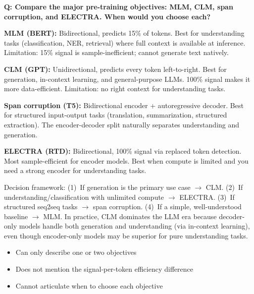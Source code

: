 \begin{interviewq}
\textbf{Q: Compare the major pre-training objectives: MLM, CLM, span corruption,
and ELECTRA. When would you choose each?}

 \quad {} \quad \badgefreq{\freqmed}

\stronganswer
\textbf{MLM (BERT):} Bidirectional, predicts 15\% of tokens.  Best for
understanding tasks (classification, NER, retrieval) where full context is
available at inference.  Limitation: 15\% signal is sample-inefficient; cannot
generate text natively.

\textbf{CLM (GPT):} Unidirectional, predicts every token left-to-right.  Best for
generation, in-context learning, and general-purpose LLMs.  100\% signal makes it
more data-efficient.  Limitation: no right context for understanding tasks.

\textbf{Span corruption (T5):} Bidirectional encoder + autoregressive decoder.  Best
for structured input-output tasks (translation, summarization, structured extraction).
The encoder-decoder split naturally separates understanding and generation.

\textbf{ELECTRA (RTD):} Bidirectional, 100\% signal via replaced token detection.
Most sample-efficient for encoder models.  Best when compute is limited and you
need a strong encoder for understanding tasks.

Decision framework: (1)~If generation is the primary use case $\rightarrow$ CLM.
(2)~If understanding/classification with unlimited compute $\rightarrow$ ELECTRA.
(3)~If structured seq2seq tasks $\rightarrow$ span corruption. (4)~If a simple,
well-understood baseline $\rightarrow$ MLM.  In practice, CLM dominates the LLM
era because decoder-only models handle both generation and understanding (via
in-context learning), even though encoder-only models may be superior for
pure understanding tasks.

\redflags
\begin{itemize}
    \item Can only describe one or two objectives
    \item Does not mention the signal-per-token efficiency difference
    \item Cannot articulate when to choose each objective
\end{itemize}



\end{interviewq}
